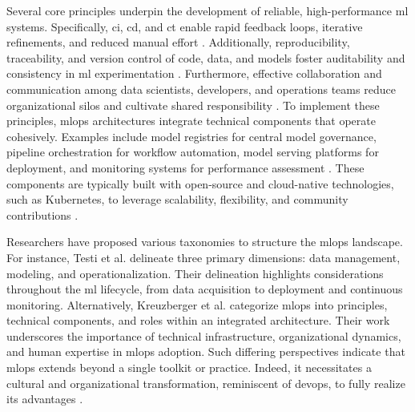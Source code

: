 Several core principles underpin the development of reliable, high-performance \gls{ml} systems. Specifically, \gls{ci}, \gls{cd}, and \gls{ct} enable rapid feedback loops, iterative refinements, and reduced manual effort \cite{burgueno-romeroOpenSourceMLOps2025, johnMLOpsFrameworkMaturity2021, karamitsosApplyingDevOpsPractices2020, kreuzbergerMachineLearningOperations2023}. Additionally, reproducibility, traceability, and version control of code, data, and models foster auditability and consistency in \gls{ml} experimentation \cite{burgueno-romeroOpenSourceMLOps2025, kreuzbergerMachineLearningOperations2023}. Furthermore, effective collaboration and communication among data scientists, developers, and operations teams reduce organizational silos and cultivate shared responsibility \cite{burgueno-romeroOpenSourceMLOps2025, johnMLOpsFrameworkMaturity2021, kreuzbergerMachineLearningOperations2023}. To implement these principles, \gls{mlops} architectures integrate technical components that operate cohesively. Examples include model registries for central model governance, pipeline orchestration for workflow automation, model serving platforms for deployment, and monitoring systems for performance assessment \cite{burgueno-romeroOpenSourceMLOps2025, kreuzbergerMachineLearningOperations2023}. These components are typically built with open-source and cloud-native technologies, such as Kubernetes, to leverage scalability, flexibility, and community contributions \cite{burgueno-romeroOpenSourceMLOps2025}.

Researchers have proposed various taxonomies to structure the \gls{mlops} landscape. For instance, Testi et al. \cite{testiMLOpsTaxonomyMethodology2022} delineate three primary dimensions: data management, modeling, and operationalization. Their delineation highlights considerations throughout the \gls{ml} lifecycle, from data acquisition to deployment and continuous monitoring. Alternatively, Kreuzberger et al. \cite{kreuzbergerMachineLearningOperations2023} categorize \gls{mlops} into principles, technical components, and roles within an integrated architecture. Their work underscores the importance of technical infrastructure, organizational dynamics, and human expertise in \gls{mlops} adoption. Such differing perspectives indicate that \gls{mlops} extends beyond a single toolkit or practice. Indeed, it necessitates a cultural and organizational transformation, reminiscent of \gls{devops}, to fully realize its advantages \cite{johnMLOpsFrameworkMaturity2021, karamitsosApplyingDevOpsPractices2020}.

